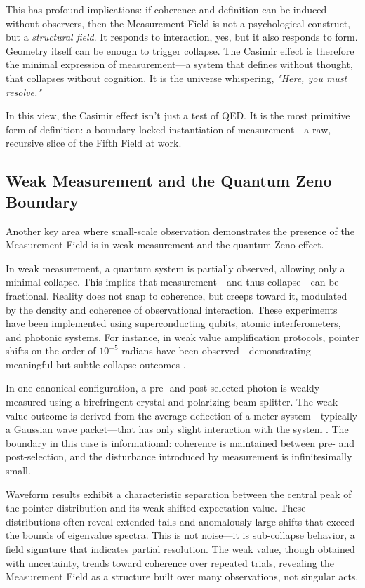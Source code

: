 This has profound implications: if coherence and definition can be induced without observers, then the Measurement Field is not a psychological construct, but a \textit{structural field}. It responds to interaction, yes, but it also responds to form. Geometry itself can be enough to trigger collapse. The Casimir effect is therefore the minimal expression of measurement---a system that defines without thought, that collapses without cognition. It is the universe whispering, \textit{"Here, you must resolve."}

In this view, the Casimir effect isn't just a test of QED. It is the most primitive form of definition: a boundary-locked instantiation of measurement---a raw, recursive slice of the Fifth Field at work.

\subsection{Weak Measurement and the Quantum Zeno Boundary}

Another key area where small-scale observation demonstrates the presence of the Measurement Field is in weak measurement and the quantum Zeno effect.

In weak measurement, a quantum system is partially observed, allowing only a minimal collapse. This implies that measurement---and thus collapse---can be fractional. Reality does not snap to coherence, but creeps toward it, modulated by the density and coherence of observational interaction. These experiments have been implemented using superconducting qubits, atomic interferometers, and photonic systems. For instance, in weak value amplification protocols, pointer shifts on the order of $10^{-5}$ radians have been observed---demonstrating meaningful but subtle collapse outcomes \cite{collapse_foundations}.

In one canonical configuration, a pre- and post-selected photon is weakly measured using a birefringent crystal and polarizing beam splitter. The weak value outcome is derived from the average deflection of a meter system---typically a Gaussian wave packet---that has only slight interaction with the system \cite{collapse_foundations}. The boundary in this case is informational: coherence is maintained between pre- and post-selection, and the disturbance introduced by measurement is infinitesimally small.

Waveform results exhibit a characteristic separation between the central peak of the pointer distribution and its weak-shifted expectation value. These distributions often reveal extended tails and anomalously large shifts that exceed the bounds of eigenvalue spectra. This is not noise---it is sub-collapse behavior, a field signature that indicates partial resolution. The weak value, though obtained with uncertainty, trends toward coherence over repeated trials, revealing the Measurement Field as a structure built over many observations, not singular acts.

